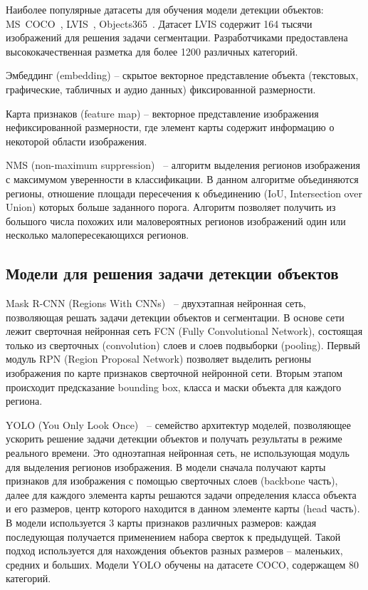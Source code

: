 \documentclass[a4paper,14pt]{article}
\begin{document}
    Наиболее популярные датасеты для обучения модели детекции объектов: MS~COCO~\cite{COCO}, LVIS~\cite{LVIS}, Objects365~\cite{Objects365}.
    Датасет LVIS содержит 164 тысячи изображений для решения задачи сегментации. Разработчиками предоставлена высококачественная разметка для более 1200 различных категорий.

    Эмбеддинг (embedding) -- скрытое векторное представление объекта (текстовых, графические, табличных и аудио данных) фиксированной размерности.

    Карта признаков (feature map) -- векторное представление изображения нефиксированной размерности, где элемент карты содержит информацию о некоторой области изображения.

    NMS (non-maximum suppression)~\cite{neubeck2006efficient} -- алгоритм выделения регионов изображения с максимумом уверенности в классификации.
    В данном алгоритме объединяются регионы, отношение площади пересечения к объединению (IoU, Intersection over Union) которых больше заданного порога.
    Алгоритм позволяет получить из большого числа похожих или маловероятных регионов изображений один или несколько малопересекающихся регионов.

    \subsection{Модели для решения задачи детекции объектов}

    Mask R-CNN (Regions With CNNs)~\cite{MaskRCNN} -- двухэтапная нейронная сеть, позволяющая решать задачи детекции объектов и сегментации. В основе сети лежит сверточная нейронная сеть FCN (Fully Convolutional Network), состоящая только из сверточных (convolution) слоев и слоев подвыборки (pooling). Первый модуль RPN (Region Proposal Network) позволяет выделить регионы изображения по карте признаков сверточной нейронной сети. Вторым этапом происходит предсказание bounding box, класса и маски объекта для каждого региона.

    YOLO (You Only Look Once)~\cite{redmon2016you} -- семейство архитектур моделей, позволяющее ускорить решение задачи детекции объектов и получать результаты в режиме реального времени.
    Это одноэтапная нейронная сеть, не использующая модуль для выделения регионов изображения.
    В модели сначала получают карты признаков для изображения с помощью сверточных слоев (backbone часть), далее для каждого элемента карты решаются задачи определения класса объекта и его размеров, центр которого находится в данном элементе карты (head часть).
    В модели используется 3 карты признаков различных размеров: каждая последующая получается применением набора сверток к предыдущей.
    Такой подход используется для нахождения объектов разных размеров -- маленьких, средних и больших.
    Модели YOLO обучены на датасете COCO, содержащем 80 категорий.
\end{document}
